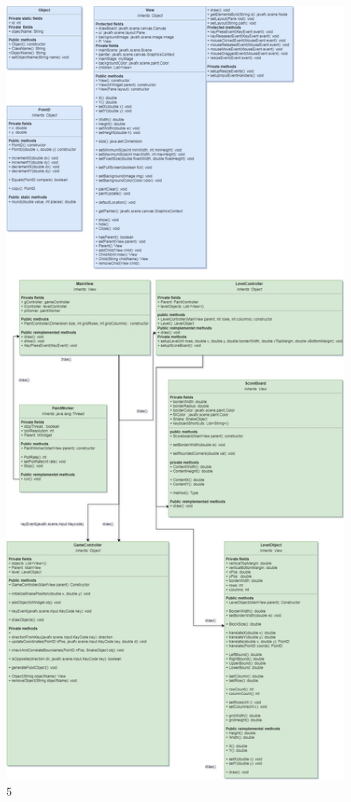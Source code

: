 \documentclass[]{article}
\begin{document}
\pagebreak
\begin{figure}[h!]
	\centering
	\includegraphics[width=\linewidth]{Structural_diagram.jpg}
	\label{fig:structure}5
\end{figure}
\end{document}
